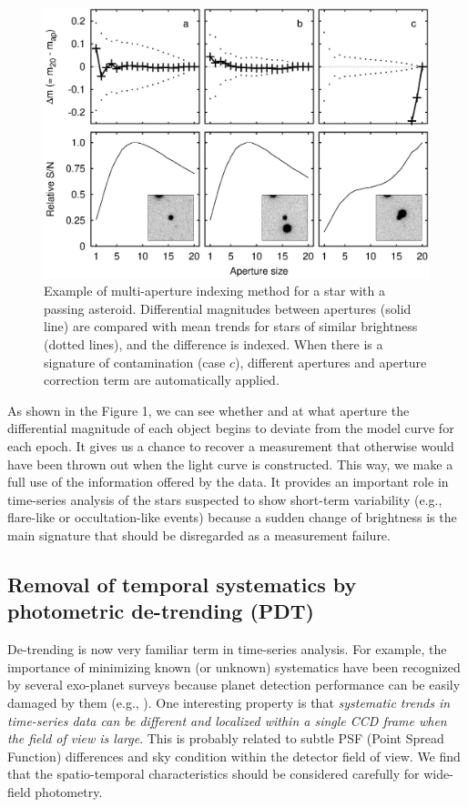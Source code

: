 \begin{figure}[!ht]
\begin{center}
\includegraphics[scale=0.45]{part2/Chang_O07/O07_f1.eps}
\caption{Example of multi-aperture indexing method for a star with a passing asteroid.  Differential magnitudes between apertures (solid line) are compared with mean trends for stars of similar brightness (dotted lines), and the difference is indexed.  When there is a signature of contamination (case $c$), different apertures and aperture correction term are automatically applied.}
\end{center}
\label{Fig1}
\end{figure}

\noindent As shown in the Figure 1, we can see whether and at what aperture the differential magnitude of each object begins to deviate from the model curve for each epoch.  It gives us a chance to recover a measurement that otherwise would have been thrown out when the light curve is constructed.  This way, we make a full use of the information offered by the data.  It provides an important role in time-series analysis of the stars suspected to show short-term variability (e.g., flare-like or occultation-like events) because a sudden change of brightness is the main signature that should be disregarded as a measurement failure.  

\subsection{Removal of temporal systematics by photometric de-trending (PDT)}
De-trending is now very familiar term in time-series analysis.  For example, the importance of minimizing known (or unknown) systematics have been recognized by several exo-planet surveys because planet detection performance can be easily damaged by them (e.g., \citealt{kov05, tam05, pon06}).  One interesting property is that {\itshape systematic trends in time-series data can be different and localized within a single CCD frame when the field of view is large}.  This is probably related to subtle PSF (Point Spread Function) differences and sky condition within the detector field of view.  We find that the spatio-temporal characteristics should be considered carefully for wide-field photometry.


